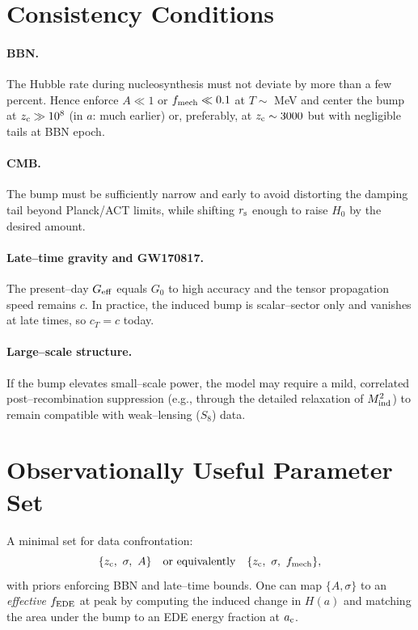 \documentclass[11pt,a4paper]{article}
\newcommand{\rs}{r_{\rm s}}
\newcommand{\Geff}{G_{\rm eff}}
\newcommand{\ac}{a_{\rm c}}
\newcommand{\zc}{z_{\rm c}}
\begin{document}
\section{Consistency Conditions}
\paragraph{BBN.} The Hubble rate during nucleosynthesis must not deviate by more than a few percent. Hence enforce $A\ll1$ or $f_{\rm mech}\ll 0.1$ at $T\!\sim$ MeV and center the bump at $\zc\gg 10^8$ (in $a$: much earlier) or, preferably, at $\zc \sim 3000$ but with negligible tails at BBN epoch.

\paragraph{CMB.} The bump must be sufficiently narrow and early to avoid distorting the damping tail beyond Planck/ACT limits, while shifting $\rs$ enough to raise $H_0$ by the desired amount.

\paragraph{Late--time gravity and GW170817.} The present--day $\Geff$ equals $G_0$ to high accuracy and the tensor propagation speed remains $c$. In practice, the induced bump is scalar--sector only and vanishes at late times, so $c_T= c$ today.

\paragraph{Large--scale structure.} If the bump elevates small--scale power, the model may require a mild, correlated post--recombination suppression (e.g., through the detailed relaxation of $M_{\rm ind}^2$) to remain compatible with weak--lensing ($S_8$) data.

\section{Observationally Useful Parameter Set}
A minimal set for data confrontation:
\[
\{\zc,\ \sigma,\ A\}\quad \text{or equivalently}\quad \{\zc,\ \sigma,\ f_{\rm mech}\},
\]
with priors enforcing BBN and late--time bounds. One can map $\{A,\sigma\}$ to an \emph{effective} $f_{\rm EDE}$ at peak by computing the induced change in $H(a)$ and matching the area under the bump to an EDE energy fraction at $\ac$.
\end{document}
